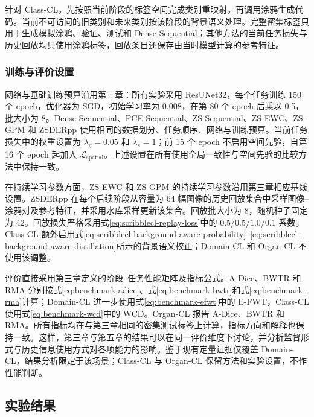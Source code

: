 针对 Class-CL，先按照当前阶段的标签空间完成类别重映射，再调用涂鸦生成代码。当前不可访问的旧类别和未来类别按该阶段的背景语义处理。完整密集标签只用于生成模拟涂鸦、验证、测试和 Dense-Sequential；其他方法的当前任务损失与历史回放均只使用涂鸦标签，回放条目还保存由当时模型计算的参考特征。

\subsubsection{训练与评价设置}
\label{subsubsec:scribblecl-training-evaluation}

网络与基础训练预算沿用第三章：所有实验采用 ResUNet32，每个任务训练 150 个 epoch，优化器为 SGD，初始学习率为 0.008，在第 80 个 epoch 后乘以 0.5，批大小为 8。Dense-Sequential、PCE-Sequential、ZS-Sequential、ZS-EWC、ZS-GPM 和 ZSDERpp 使用相同的数据划分、任务顺序、网络与训练预算。当前任务损失中的权重设置为 $\lambda_g=0.05$ 和 $\lambda_s=1$；前 15 个 epoch 不启用空间先验，自第 16 个 epoch 起加入 $\mathcal{L}_{\mathrm{spatial}}$。上述设置在所有使用全局一致性与空间先验的比较方法中保持一致\cite{zhang2026zscribbleseg}。

在持续学习参数方面，ZS-EWC 和 ZS-GPM 的持续学习参数沿用第三章相应基线设置\cite{kirkpatrick2017ewc,saha2021gpm}。ZSDERpp 在每个后续阶段从容量为 64 幅图像的历史回放集合中采样图像--涂鸦对及参考特征，并采用水库采样更新该集合。回放批大小为 8，随机种子固定为 42。回放损失严格采用式\eqref{eq:scribblecl-replay-loss}中的 $0.5/0.5/1.0/0.1$ 系数。Class-CL 额外启用式\eqref{eq:scribblecl-background-aware-probability}--\eqref{eq:scribblecl-background-aware-distillation}所示的背景语义校正；Domain-CL 和 Organ-CL 不使用该调整。

评价直接采用第三章定义的阶段--任务性能矩阵及指标公式。A-Dice、BWTR 和 RMA 分别按式\eqref{eq:benchmark-adice}、式\eqref{eq:benchmark-bwtr}和式\eqref{eq:benchmark-rma}计算；Domain-CL 进一步使用式\eqref{eq:benchmark-efwt}中的 E-FWT，Class-CL 使用式\eqref{eq:benchmark-wcd}中的 WCD。Organ-CL 报告 A-Dice、BWTR 和 RMA。所有指标均在与第三章相同的密集测试标签上计算，指标方向和解释也保持一致。这样，第三章与第五章的结果可以在同一评价维度下讨论，并分析监督形式与历史信息使用方式对各项能力的影响。鉴于现有定量证据仅覆盖 Domain-CL，结果分析限定于该场景；Class-CL 与 Organ-CL 保留方法和实验设置，不作性能判断。

\subsection{实验结果}
\label{subsec:scribblecl-results}

